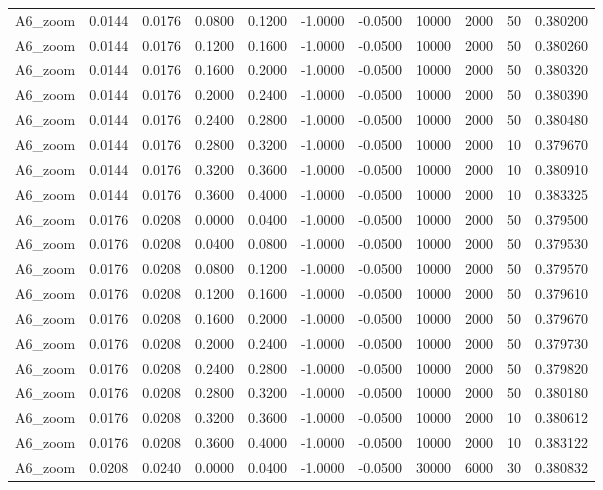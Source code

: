 \documentclass{article}
\begin{document}
\begin{longtable}{l r r r r r r r r r l}
A6_zoom & 0.0144 & 0.0176 & 0.0800 & 0.1200 & -1.0000 & -0.0500 & 10000 & 2000 & 50 & 0.380200 \\
A6_zoom & 0.0144 & 0.0176 & 0.1200 & 0.1600 & -1.0000 & -0.0500 & 10000 & 2000 & 50 & 0.380260 \\
A6_zoom & 0.0144 & 0.0176 & 0.1600 & 0.2000 & -1.0000 & -0.0500 & 10000 & 2000 & 50 & 0.380320 \\
A6_zoom & 0.0144 & 0.0176 & 0.2000 & 0.2400 & -1.0000 & -0.0500 & 10000 & 2000 & 50 & 0.380390 \\
A6_zoom & 0.0144 & 0.0176 & 0.2400 & 0.2800 & -1.0000 & -0.0500 & 10000 & 2000 & 50 & 0.380480 \\
A6_zoom & 0.0144 & 0.0176 & 0.2800 & 0.3200 & -1.0000 & -0.0500 & 10000 & 2000 & 10 & 0.379670 \\
A6_zoom & 0.0144 & 0.0176 & 0.3200 & 0.3600 & -1.0000 & -0.0500 & 10000 & 2000 & 10 & 0.380910 \\
A6_zoom & 0.0144 & 0.0176 & 0.3600 & 0.4000 & -1.0000 & -0.0500 & 10000 & 2000 & 10 & 0.383325 \\
A6_zoom & 0.0176 & 0.0208 & 0.0000 & 0.0400 & -1.0000 & -0.0500 & 10000 & 2000 & 50 & 0.379500 \\
A6_zoom & 0.0176 & 0.0208 & 0.0400 & 0.0800 & -1.0000 & -0.0500 & 10000 & 2000 & 50 & 0.379530 \\
A6_zoom & 0.0176 & 0.0208 & 0.0800 & 0.1200 & -1.0000 & -0.0500 & 10000 & 2000 & 50 & 0.379570 \\
A6_zoom & 0.0176 & 0.0208 & 0.1200 & 0.1600 & -1.0000 & -0.0500 & 10000 & 2000 & 50 & 0.379610 \\
A6_zoom & 0.0176 & 0.0208 & 0.1600 & 0.2000 & -1.0000 & -0.0500 & 10000 & 2000 & 50 & 0.379670 \\
A6_zoom & 0.0176 & 0.0208 & 0.2000 & 0.2400 & -1.0000 & -0.0500 & 10000 & 2000 & 50 & 0.379730 \\
A6_zoom & 0.0176 & 0.0208 & 0.2400 & 0.2800 & -1.0000 & -0.0500 & 10000 & 2000 & 50 & 0.379820 \\
A6_zoom & 0.0176 & 0.0208 & 0.2800 & 0.3200 & -1.0000 & -0.0500 & 10000 & 2000 & 50 & 0.380180 \\
A6_zoom & 0.0176 & 0.0208 & 0.3200 & 0.3600 & -1.0000 & -0.0500 & 10000 & 2000 & 10 & 0.380612 \\
A6_zoom & 0.0176 & 0.0208 & 0.3600 & 0.4000 & -1.0000 & -0.0500 & 10000 & 2000 & 10 & 0.383122 \\
A6_zoom & 0.0208 & 0.0240 & 0.0000 & 0.0400 & -1.0000 & -0.0500 & 30000 & 6000 & 30 & 0.380832 \\

\end{longtable}
\end{document}

